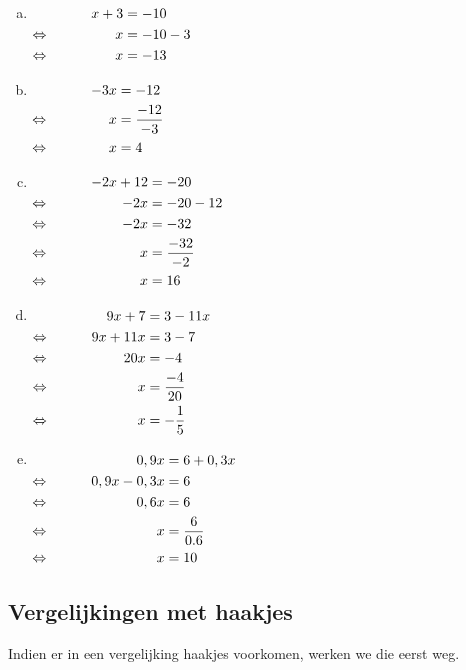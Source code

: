 \documentclass[12pt]{article}
\begin{document}
\begin{solution}
\vspace{-2\topsep}
\begin{enumerate}[(a)]
\item $\begin{aligned}[t]
     && x+3 &= -10\\
\Leftrightarrow\mkern40mu &&   x &= -10 -3\\
\Leftrightarrow\mkern40mu &&   x &= -13
\end{aligned}$
\item $\begin{aligned}[t]
     && -3x &= -12\\
\Leftrightarrow\mkern40mu &&   x &= \dfrac{-12}{-3}\\
\Leftrightarrow\mkern40mu &&   x &= 4
\end{aligned}$
\item $\begin{aligned}[t]
     && - 2x + 12	&= - 20\\
\Leftrightarrow\mkern40mu &&      - 2x &= - 20 - 12\\
\Leftrightarrow\mkern40mu &&      - 2x &= - 32\\
\Leftrightarrow\mkern40mu &&        x	&= \dfrac{-32}{-2}\\
\Leftrightarrow\mkern40mu &&        x  &= 16
\end{aligned}$
\item $\begin{aligned}[t]
     && 9x + 7 &= 3 - 11x\\
\Leftrightarrow\mkern40mu && 9x + 11x	&= 3 - 7\\
\Leftrightarrow\mkern40mu && 20x	&= - 4\\
\Leftrightarrow\mkern40mu && x &= \dfrac{-4}{20}\\
\Leftrightarrow\mkern40mu && x &= -\dfrac{1}{5}\\
\end{aligned}$
\item $\begin{aligned}[t]
     && 0,9x	&= 6 + 0,3x \\
\Leftrightarrow\mkern40mu && 0,9x - 0,3x	&= 6\\
\Leftrightarrow\mkern40mu && 0,6x	&= 6\\
\Leftrightarrow\mkern40mu && x	&= \dfrac{6}{0.6} \\
\Leftrightarrow\mkern40mu && x &= 10\\
\end{aligned}$
\end{enumerate}
\end{solution}

\subsection{Vergelijkingen met haakjes}
Indien er in een vergelijking haakjes voorkomen, werken we die eerst weg.
\end{document}
